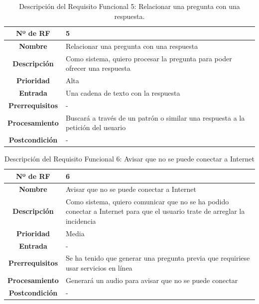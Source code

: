 \begin{table}[H]
\begin{tabularx}{\textwidth}{|c|X|}
		\hline
		\textbf{Nº de RF }          &  5 \\ 
		\hline
		\textbf{Nombre}         &  Relacionar una pregunta con una respuesta  \\ 
		\hline
		\textbf{Descripción}    &  Como sistema, quiero procesar la pregunta para poder ofrecer una respuesta \\ 
		\hline
		\textbf{Prioridad}      &  Alta  \\ 
		\hline
		\textbf{Entrada}        & Una cadena de texto con la respuesta  \\ 
		\hline
		\textbf{Prerrequisitos} & - \\ 
		\hline
		\textbf{Procesamiento}  &  Buscará a través de un patrón o similar una respuesta a la petición del usuario \\ 
		\hline
		\textbf{Postcondición}  &  - \\
		\hline
	\end{tabularx}
	\caption{Descripción del Requisito Funcional 5: Relacionar una pregunta con una respuesta.}
\end{table}


\begin{table}[H]
	\centering
	\begin{tabularx}{\textwidth}{|c|X|} 
		\hline
		\textbf{Nº de RF }          &  6 \\ 
		\hline
		\textbf{Nombre}         &  Avisar que no se puede conectar a Internet  \\ 
		\hline
		\textbf{Descripción}    &  Como sistema, quiero comunicar que no se ha podido conectar a Internet para que el usuario trate de arreglar la incidencia \\ 
		\hline
		\textbf{Prioridad}      &  Media  \\ 
		\hline
		\textbf{Entrada}        & - \\ 
		\hline
		\textbf{Prerrequisitos} & Se ha tenido que generar una pregunta previa que requiriese usar servicios en línea  \\ 
		\hline
		\textbf{Procesamiento}  &  Generará un audio para avisar que no se puede conectar \\ 
		\hline
		\textbf{Postcondición}  &  - \\
		\hline
	\end{tabularx}
	\caption{Descripción del Requisito Funcional 6: Avisar que no se puede conectar a Internet}
\end{table}

